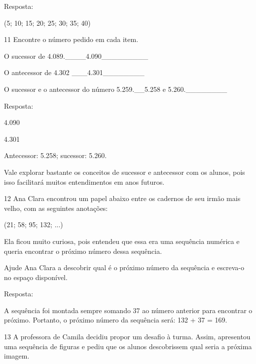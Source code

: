 \begin{escolha}

Resposta:

(5; 10; 15; 20; 25; 30; 35; 40)

\num{11} Encontre o número pedido em cada item.

\begin{escolha}

\item
  O sucessor de 4.089.\_\_\_\_4.090\_\_\_\_\_\_\_\_\_
\item
  O antecessor de 4.302 \_\_\_4.301\_\_\_\_\_\_\_\_
\item
  O sucessor e o antecessor do número 5.259.\_\_5.258 e 5.260.\_\_\_\_\_\_\_\_
\end{escolha}

Resposta:

\begin{escolha}

\item
  4.090
\item
  4.301
\item
  Antecessor: 5.258; sucessor: 5.260.
\end{escolha}

Vale explorar bastante os conceitos de sucessor e antecessor com
os alunos, pois isso facilitará muitos entendimentos em anos futuros.

\num{12} Ana Clara encontrou um papel abaixo entre os cadernos de seu irmão mais velho, com as seguintes anotações:

(21; 58; 95; 132; ...)

Ela ficou muito curiosa, pois entendeu que essa era uma sequência
numérica e queria encontrar o próximo número dessa sequência.

Ajude Ana Clara a descobrir qual é o próximo número da sequência e escreva-o no espaço disponível.


Resposta:

A sequência foi montada sempre somando 37 ao número anterior para
encontrar o próximo. Portanto, o próximo número da sequência será: 132 + 37 = 169.

\num{13} A professora de Camila decidiu propor um desafio à turma. Assim, apresentou uma sequência de figuras e pediu que os alunos descobrissem qual seria a próxima imagem. 



\end{escolha}
